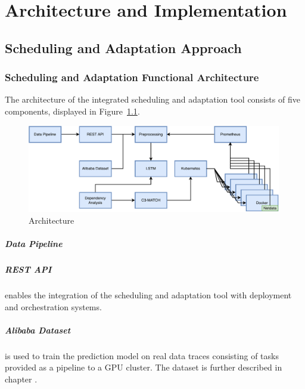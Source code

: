 \chapter{Architecture and Implementation}
\label{ch:architecture-and-implementation}

  \section{Scheduling and Adaptation Approach}
  \label{sec:scheduling-and-adaptation-approach-architecture}

    \subsection{Scheduling and Adaptation Functional Architecture}
    The architecture of the integrated \SAA{} scheduling and adaptation tool consists of five components, displayed in Figure~\ref{fig:data-cloud-architecture}.

    \begin{figure}
        \centering
        \includegraphics[width=0.99\textwidth]{figures/saa_diagram.pdf}
        \caption{\SAA Architecture}
        \label{fig:data-cloud-architecture}
    \end{figure}

      \paragraph{Data Pipeline} 

      \paragraph{REST API} enables the integration of the \SAA{} scheduling and adaptation tool with deployment and orchestration systems. \cite{kimovskiBigDataPipeline2022}

      \paragraph{Alibaba Dataset} is used to train the prediction model on real data traces consisting of tasks provided as a pipeline to a GPU cluster. The dataset is further described in chapter .

